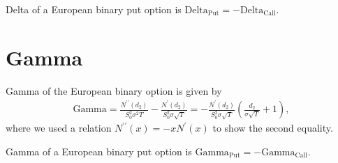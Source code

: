 \documentclass{article}
\newcommand\br[1]{\left(#1\right)}
\begin{document}
Delta of a European binary put option is $\text{Delta}_\text{Put} = - \text{Delta}_\text{Call}$.


\section*{Gamma}


Gamma of the European binary option is given by
\begin{align}
    \text{Gamma}
        = \frac{N^{\prime\prime}(d_2)}{S_0^2 \sigma^2 T}
            - \frac{N^{\prime}(d_2)}{S_0^2 \sigma \sqrt{T}}
        = - \frac{N^{\prime}(d_2)}{S_0^2 \sigma \sqrt{T}}
            \br{\frac{d_2}{\sigma \sqrt{T}} + 1} ,
    \label{eq:gamma}
\end{align}
where we used a relation $N^{\prime\prime}(x) = - x N^\prime(x)$ to show the second equality.

Gamma of a European binary put option is $\text{Gamma}_\text{Put} = - \text{Gamma}_\text{Call}$.
\end{document}
